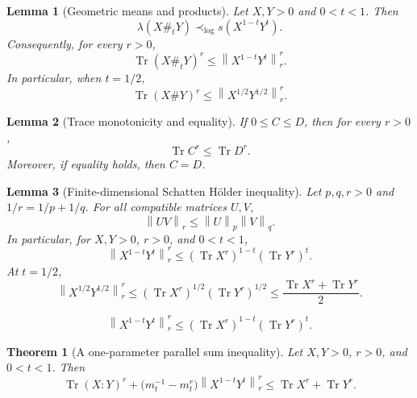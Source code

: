 \documentclass[10pt,a4paper]{amsart}
\newtheorem{lemma}{Lemma}
\newtheorem{theorem}{Theorem}
\newcommand{\Tr}{\operatorname{Tr}}
\newcommand{\norm}[1]{\left\lVert #1\right\rVert}
\begin{document}
\begin{lemma}[Geometric means and products]\label{lem:ando-hiai}
Let \(X,Y>0\) and \(0<t<1\).  Then
\begin{equation}\label{eq:AH-weighted}
    \lambda(X\#_tY)\prec_{\log}s(X^{1-t}Y^t).
\end{equation}
Consequently, for every \(r>0\),
\begin{equation}\label{eq:geomean-trace-bound-weighted}
    \Tr(X\#_tY)^r\le \norm{X^{1-t}Y^t}_r^r.
\end{equation}
In particular, when \(t=1/2\),
\begin{equation}\label{eq:geomean-trace-bound}
    \Tr(X\#Y)^r\le \norm{X^{1/2}Y^{1/2}}_r^r.
\end{equation}
\end{lemma}

\begin{lemma}[Trace monotonicity and equality]\label{lem:trace-monotone}
If \(0\le C\le D\), then for every \(r>0\),
\[
    \Tr C^r\le \Tr D^r.
\]
Moreover, if equality holds, then \(C=D\).
\end{lemma}

\begin{lemma}[Finite-dimensional Schatten H\"older inequality]\label{lem:holder}
Let \(p,q,r>0\) and \(1/r=1/p+1/q\).  For all compatible matrices \(U,V\),
\[
    \norm{UV}_r\le \norm{U}_p\norm{V}_q.
\]
In particular, for \(X,Y>0\), \(r>0\), and \(0<t<1\),
\begin{equation}\label{eq:holder-weighted-special}
    \norm{X^{1-t}Y^t}_r^r
    \le
    (\Tr X^r)^{1-t}(\Tr Y^r)^t.
\end{equation}
At \(t=1/2\),
\begin{equation}\label{eq:holder-special}
    \norm{X^{1/2}Y^{1/2}}_r^r
    \le
    (\Tr X^r)^{1/2}(\Tr Y^r)^{1/2}
    \le
    \frac{\Tr X^r+\Tr Y^r}{2}.
\end{equation}
\end{lemma}

\begin{equation}
    \norm{X^{1-t}Y^t}_r^r
    \le
    (\Tr X^r)^{1-t}(\Tr Y^r)^t.
\end{equation}

\begin{theorem}[A one-parameter parallel sum inequality]\label{thm:parallel-asym}
Let \(X,Y>0\), \(r>0\), and \(0<t<1\).  Then
\begin{equation}\label{eq:parallel-asym}
    \Tr(X:Y)^r+
    \bigl(m_t^{-1}-m_t^r\bigr)\norm{X^{1-t}Y^t}_r^r
    \le
    \Tr X^r+\Tr Y^r .
\end{equation}
\end{theorem}
\end{document}
